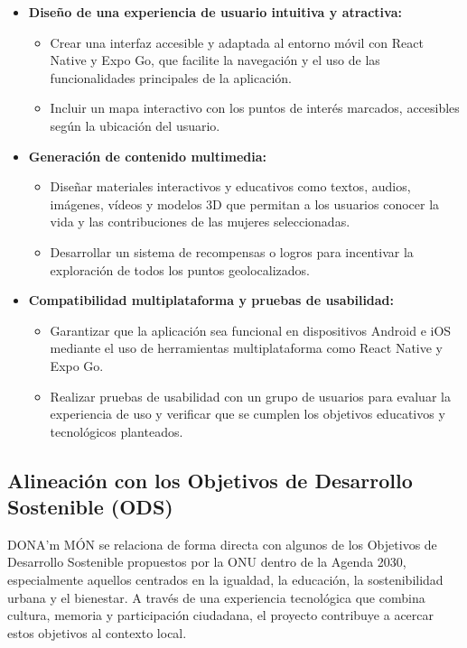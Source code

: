 \begin{itemize}
    \item \textbf{Diseño de una experiencia de usuario intuitiva y atractiva:}
    \begin{itemize}
        \item Crear una interfaz accesible y adaptada al entorno móvil con React Native y Expo Go, que facilite la navegación y el uso de las funcionalidades principales de la aplicación.
        \item Incluir un mapa interactivo con los puntos de interés marcados, accesibles según la ubicación del usuario.
    \end{itemize}

    \item \textbf{Generación de contenido multimedia:}
    \begin{itemize}
        \item Diseñar materiales interactivos y educativos como textos, audios, imágenes, vídeos y modelos 3D que permitan a los usuarios conocer la vida y las contribuciones de las mujeres seleccionadas.
        \item Desarrollar un sistema de recompensas o logros para incentivar la exploración de todos los puntos geolocalizados.
    \end{itemize}

    \item \textbf{Compatibilidad multiplataforma y pruebas de usabilidad:}
    \begin{itemize}
        \item Garantizar que la aplicación sea funcional en dispositivos Android e iOS mediante el uso de herramientas multiplataforma como React Native y Expo Go.
        \item Realizar pruebas de usabilidad con un grupo de usuarios para evaluar la experiencia de uso y verificar que se cumplen los objetivos educativos y tecnológicos planteados.
    \end{itemize}
\end{itemize}

\subsection{Alineación con los Objetivos de Desarrollo Sostenible (ODS)}

DONA'm MÓN se relaciona de forma directa con algunos de los Objetivos de Desarrollo Sostenible propuestos por la ONU dentro de la Agenda 2030, especialmente aquellos centrados en la igualdad, la educación, la sostenibilidad urbana y el bienestar. A través de una experiencia tecnológica que combina cultura, memoria y participación ciudadana, el proyecto contribuye a acercar estos objetivos al contexto local. \cite{onuAgenda2030,odsIgualdad,odsCiudades}

